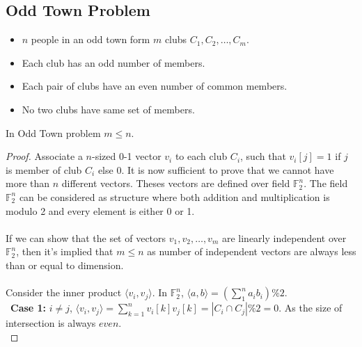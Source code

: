 \subsection{Odd Town Problem}
\begin{itemize}
    \item $n$ people in an odd town form $m$ clubs $C_1, C_2, \hdots, C_m$.
    \item Each club has an odd number of members.
    \item Each pair of clubs have an even number of common members.
    \item No two clubs have same set of members.
\end{itemize}
\begin{theorem}In Odd Town problem $m \le n$.
\begin{proof}
Associate a $n$-sized 0-1 vector $v_i$ to each club $C_i$, such that $v_i[j]=1$ if $j$ is member of club $C_i$ else 0. It is now sufficient to prove that we cannot have more than $n$ different vectors. Theses vectors are defined over field $\mathbb{F}_2^n$. The field $\mathbb{F}_2^n$ can be considered as structure where both addition and multiplication is modulo 2 and every element is either 0 or 1.\\\\
If we can show that the set of vectors $v_1, v_2, \hdots, v_m$ are linearly independent over $\mathbb{F}_2^n$, then it's implied that $m \le n$ as number of independent vectors are always less than or equal to dimension.\\\\
Consider the inner product $\langle v_i,v_j\rangle$. In $\mathbb{F}_2^n$, $\langle a,b\rangle = (\sum_{1}^{n} a_ib_i)\%2$.\\

~\textbf{Case 1:} $i\neq j$, $\langle v_i,v_j\rangle = \sum_{k=1}^{n} v_i[k]v_j[k] = | C_i \cap C_j |\%2 = 0$. As the size of intersection is always $even$.\\


\end{proof}
\end{theorem}
